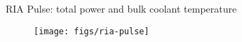 \begin{frame}{RIA Pulse: total power and bulk coolant temperature}

    \scriptsize

    \begin{figure}[h]
        \texttt{[image: figs/ria-pulse]}
    \end{figure}

\end{frame}